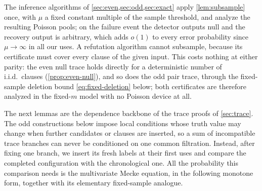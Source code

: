 \documentclass[11pt]{article}
\theoremstyle{definition}
\theoremstyle{remark}
\newcommand{\1}{\mathbf 1}
\numberwithin{equation}{section}
\begin{document}
The inference algorithms of
\cref{sec:even,sec:odd,sec:exact} apply \cref{lem:subsample} once, with
$\mu$ a fixed constant multiple of the sample threshold, and analyze the
resulting Poisson pools; on the failure event the detector outputs
\textsf{null} and the recovery output is arbitrary, which adds $o(1)$ to
every error probability since $\mu\to\infty$ in all our uses.  A
refutation algorithm cannot subsample, because its certificate must cover
every clause of the given input.  This costs nothing at either parity:
the even null trace holds directly for a deterministic number of
i.i.d.\ clauses (\cref{prop:even-null}), and so does the odd pair
trace, through the fixed-sample deletion bound \cref{eq:fixed-deletion}
below; both certificates are therefore analyzed
in the fixed-$m$ model with no Poisson device at all.

The next lemmas are the dependence backbone of the trace proofs of
\cref{sec:trace}.  The odd constructions below impose local conditions
whose truth value may change when further candidates or clauses are
inserted, so a sum of incompatible trace branches can never be
conditioned on one common filtration.  Instead, after fixing one
branch, we insert its fresh labels at their first uses and compare the
completed configuration with the chronological one.  All the
probability this comparison needs is the multivariate Mecke equation,
in the following monotone form, together with its elementary
fixed-sample analogue.
\end{document}
